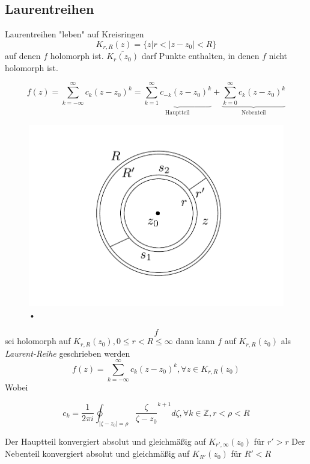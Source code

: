 \documentclass[10pt,a4paper]{article}
\begin{document}
\subsection{Laurentreihen}
Laurentreihen "leben" auf Kreisringen $$K_{r,R}(z) = \{ z | r < |z-z_0|<R\}$$ 
auf denen $f$ holomorph ist. $\overline{K_r(z_0)}$ darf Punkte enthalten, in denen $f$ nicht holomorph ist.

\begin{defi}

$$f(z)=\sum_{k=- \infty}^{\infty} c_k (z-z_0)^{k} = \underbrace{\sum_{k=1}^{\infty} c_{-k} (z-z_0)^{k}}_{\text{Hauptteil}} + \underbrace{\sum_{k=0}^{\infty} c_k (z-z_0)^{k}}_{\text{Nebenteil}}$$

\end{defi}


\begin{satz}

\begin{figure}[H]
\includegraphics[width=\textwidth]{images/laurent}
\caption{•}
\end{figure}

$$f$$ sei holomorph auf $K_{r,R}(z_0), 0 \leq r < R \leq \infty$ dann kann $f$ auf $K_{r,R}(z_0)$ als \emph{Laurent-Reihe} geschrieben werden 
$$f(z)=\sum_{k=-\infty}^{\infty} c_k (z-z_0)^{k}, \forall z \in K_{r,R}(z_0)$$ Wobei


$$c_k = \frac{1}{2 \pi i } \oint_{|\zeta-z_0|=\rho} \frac{\zeta}{\zeta-z_0}^{k+1} d\zeta , \forall k \in \mathbb{Z}, r < \rho < R$$

Der Hauptteil konvergiert absolut und gleichmäßig auf $K_{r',\infty}(z_0)$ für $r' > r$
Der Nebenteil konvergiert absolut und gleichmäßig auf $K_{R'}(z_0)$ für $R'<R$
\end{satz}
\end{document}
